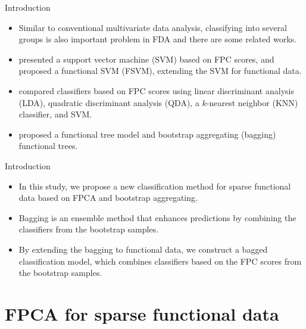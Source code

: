 \documentclass{beamer}
\begin{document}
\begin{frame}{Introduction}
	\begin{itemize}
		\item{
			Similar to conventional multivariate data analysis, classifying into several groups is also important problem in FDA and there are some related works.
		}
		\item{
			\cite{Lee2004} presented a support vector machine (SVM) based on FPC scores, and \cite{Rossi2006} proposed a functional SVM (FSVM), extending the SVM for functional data.
		}
		\item{
			\cite{Song2008} compared classifiers based on FPC scores using linear discriminant analysis (LDA), quadratic discriminant analysis (QDA), a $k$-nearest neighbor (KNN) classifier, and SVM.
		}
		\item{
			\cite{Gama2004} proposed a functional tree model and bootstrap aggregating (bagging) functional trees.
		}
	\end{itemize}
\end{frame}

\begin{frame}{Introduction}
	\begin{itemize}
		\item{
			In this study, we propose a new classification method for sparse functional data based on FPCA and bootstrap aggregating.
		}
		\item{
			Bagging is an ensemble method that enhances predictions by combining the classifiers from the bootstrap samples.
		}
		\item{
			By extending the bagging to functional data, we construct a bagged classification model, which combines classifiers based on the FPC scores from the bootstrap samples.
		}
	\end{itemize}
\end{frame}


\section{FPCA for sparse functional data}\label{ch2}
\end{document}
